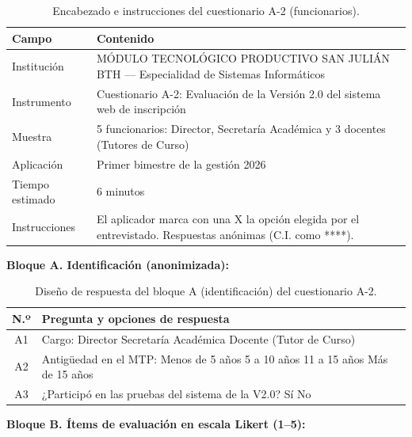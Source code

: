 \begin{table}[htbp]
    \centering
    \caption{Encabezado e instrucciones del cuestionario A-2 (funcionarios).}
    \label{tab:a2_encabezado}
    \begin{tabularx}{\textwidth}{p{} X}
        \toprule
        \textbf{Campo} & \textbf{Contenido} \\
        \midrule
        Institución & MÓDULO TECNOLÓGICO PRODUCTIVO SAN JULIÁN BTH --- Especialidad de Sistemas Informáticos \\
        Instrumento & Cuestionario A-2: Evaluación de la Versión 2.0 del sistema web de inscripción \\
        Muestra & 5 funcionarios: Director, Secretaría Académica y 3 docentes (Tutores de Curso) \\
        Aplicación & Primer bimestre de la gestión 2026 \\
        Tiempo estimado & 6 minutos \\
        Instrucciones & El aplicador marca con una X la opción elegida por el entrevistado. Respuestas anónimas (C.I. como ****). \\
        \bottomrule
    \end{tabularx}
\end{table}

\noindent\textbf{Bloque A. Identificación (anonimizada):}

\begin{table}[htbp]
    \centering
    \caption{Diseño de respuesta del bloque A (identificación) del cuestionario A-2.}
    \label{tab:a2_identificacion}
    \begin{tabularx}{\textwidth}{c L}
        \toprule
        \textbf{N.º} & \textbf{Pregunta y opciones de respuesta} \\
        \midrule
        A1 & Cargo: \casilla{} Director \quad \casilla{} Secretaría Académica \quad \casilla{} Docente (Tutor de Curso) \\
        A2 & Antigüedad en el MTP: \casilla{} Menos de 5 años \quad \casilla{} 5 a 10 años \quad \casilla{} 11 a 15 años \quad \casilla{} Más de 15 años \\
        A3 & ¿Participó en las pruebas del sistema de la V2.0? \casilla{} Sí \quad \casilla{} No \\
        \bottomrule
    \end{tabularx}
\end{table}

\noindent\textbf{Bloque B. Ítems de evaluación en escala Likert (1--5):}

